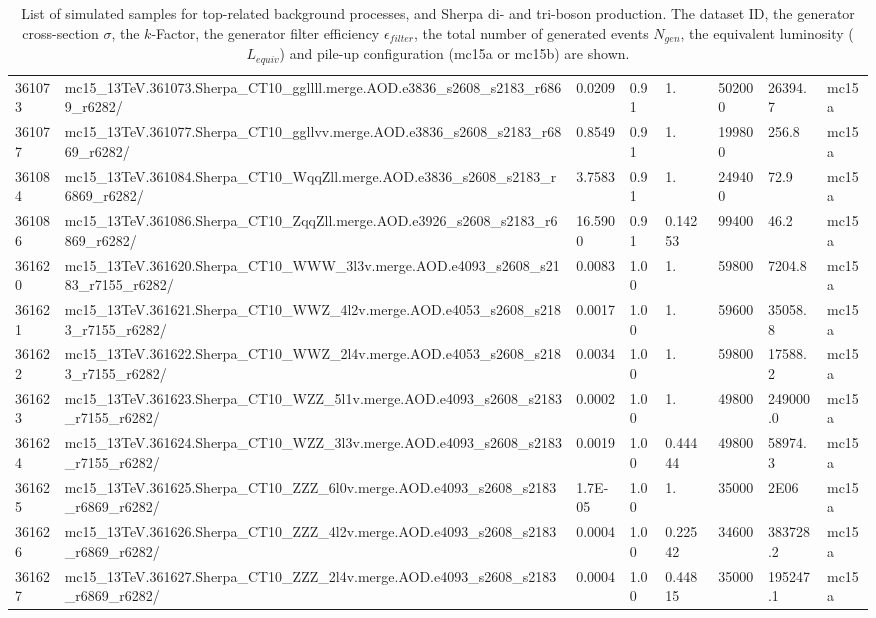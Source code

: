\begin{sidewaystable}[!hp]
\begin{center}
{\begin{tabular}{llllllll}
361073  &  mc15\_13TeV.361073.Sherpa\_CT10\_ggllll.merge.AOD.e3836\_s2608\_s2183\_r6869\_r6282/  &  0.0209  &  0.91  &  1.  &  502000  &  26394.7  &  mc15a \\
361077  &  mc15\_13TeV.361077.Sherpa\_CT10\_ggllvv.merge.AOD.e3836\_s2608\_s2183\_r6869\_r6282/  &  0.8549  &  0.91  &  1.  &  199800  &  256.8  &  mc15a \\
361084  &  mc15\_13TeV.361084.Sherpa\_CT10\_WqqZll.merge.AOD.e3836\_s2608\_s2183\_r6869\_r6282/  &  3.7583  &  0.91  &  1.  &  249400  &  72.9  &  mc15a \\
361086  &  mc15\_13TeV.361086.Sherpa\_CT10\_ZqqZll.merge.AOD.e3926\_s2608\_s2183\_r6869\_r6282/  &  16.5900  &  0.91  &  0.14253  &  99400  &  46.2  &  mc15a \\
361620  &  mc15\_13TeV.361620.Sherpa\_CT10\_WWW\_3l3v.merge.AOD.e4093\_s2608\_s2183\_r7155\_r6282/  &  0.0083  &  1.00  &  1.  &  59800  &  7204.8 &  mc15a \\
361621  &  mc15\_13TeV.361621.Sherpa\_CT10\_WWZ\_4l2v.merge.AOD.e4053\_s2608\_s2183\_r7155\_r6282/  &  0.0017  &  1.00  &  1.  &  59600  &  35058.8 &  mc15a \\
361622  &  mc15\_13TeV.361622.Sherpa\_CT10\_WWZ\_2l4v.merge.AOD.e4053\_s2608\_s2183\_r7155\_r6282/  &  0.0034  &  1.00  &  1.  &  59800  &  17588.2 &  mc15a \\
361623  &  mc15\_13TeV.361623.Sherpa\_CT10\_WZZ\_5l1v.merge.AOD.e4093\_s2608\_s2183\_r7155\_r6282/  &  0.0002  &  1.00  &  1.  &  49800  &  249000.0 &  mc15a \\
361624  &  mc15\_13TeV.361624.Sherpa\_CT10\_WZZ\_3l3v.merge.AOD.e4093\_s2608\_s2183\_r7155\_r6282/  &  0.0019  &  1.00  &  0.44444  &  49800  &  58974.3 &  mc15a \\
361625  &  mc15\_13TeV.361625.Sherpa\_CT10\_ZZZ\_6l0v.merge.AOD.e4093\_s2608\_s2183\_r6869\_r6282/  &  1.7E-05  &  1.00  &  1.  &  35000  & 2E06 &  mc15a \\
361626  &  mc15\_13TeV.361626.Sherpa\_CT10\_ZZZ\_4l2v.merge.AOD.e4093\_s2608\_s2183\_r6869\_r6282/  &  0.0004  &  1.00  &  0.22542  &  34600  &  383728.2 &  mc15a \\
361627  &  mc15\_13TeV.361627.Sherpa\_CT10\_ZZZ\_2l4v.merge.AOD.e4093\_s2608\_s2183\_r6869\_r6282/  &  0.0004  &  1.00  &  0.44815  &  35000  &  195247.1 &  mc15a \\
\hline
\hline
\end{tabular}}
\end{center}
\caption{List of simulated samples for
  top-related background processes, and Sherpa di- and tri-boson production. The dataset ID, the generator
  cross-section $\sigma$, the $k$-Factor, the generator filter
  efficiency $\epsilon_{filter}$, the total number of
  generated events $N_{gen}$, the equivalent luminosity ($L_{equiv}$) and pile-up configuration (mc15a or mc15b) are shown.}
\label{tab:BGSamples1}
\end{sidewaystable}


